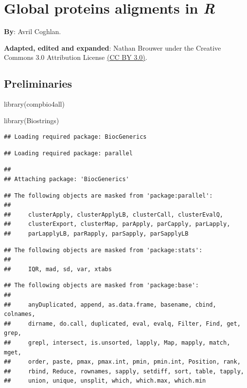 \documentclass[
]{book}
\newenvironment{Shaded}{\begin{snugshade}}{\end{snugshade}}
\newcommand{\FunctionTok}[1]{\textcolor[rgb]{0.00,0.00,0.00}{#1}}
\newcommand{\NormalTok}[1]{#1}
\begin{document}
\hypertarget{global-proteins-aligments-in-r}{%
\chapter{\texorpdfstring{Global proteins aligments in \emph{R}}{Global proteins aligments in R}}\label{global-proteins-aligments-in-r}}

\textbf{By}: Avril Coghlan.

\textbf{Adapted, edited and expanded}: Nathan Brouwer under the Creative Commons 3.0 Attribution License \href{https://creativecommons.org/licenses/by/3.0/}{(CC BY 3.0)}.

\hypertarget{preliminaries-5}{%
\section{Preliminaries}\label{preliminaries-5}}

\begin{Shaded}
\begin{Highlighting}[]
\FunctionTok{library}\NormalTok{(compbio4all)}

\FunctionTok{library}\NormalTok{(Biostrings)}
\end{Highlighting}
\end{Shaded}

\begin{verbatim}
## Loading required package: BiocGenerics
\end{verbatim}

\begin{verbatim}
## Loading required package: parallel
\end{verbatim}

\begin{verbatim}
## 
## Attaching package: 'BiocGenerics'
\end{verbatim}

\begin{verbatim}
## The following objects are masked from 'package:parallel':
## 
##     clusterApply, clusterApplyLB, clusterCall, clusterEvalQ,
##     clusterExport, clusterMap, parApply, parCapply, parLapply,
##     parLapplyLB, parRapply, parSapply, parSapplyLB
\end{verbatim}

\begin{verbatim}
## The following objects are masked from 'package:stats':
## 
##     IQR, mad, sd, var, xtabs
\end{verbatim}

\begin{verbatim}
## The following objects are masked from 'package:base':
## 
##     anyDuplicated, append, as.data.frame, basename, cbind, colnames,
##     dirname, do.call, duplicated, eval, evalq, Filter, Find, get, grep,
##     grepl, intersect, is.unsorted, lapply, Map, mapply, match, mget,
##     order, paste, pmax, pmax.int, pmin, pmin.int, Position, rank,
##     rbind, Reduce, rownames, sapply, setdiff, sort, table, tapply,
##     union, unique, unsplit, which, which.max, which.min
\end{verbatim}
\end{document}
